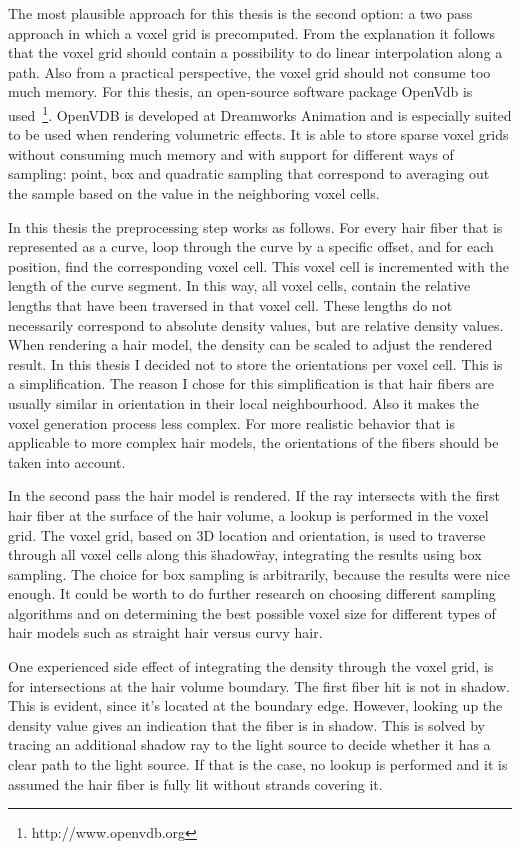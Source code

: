 \documentclass[11pt,a4paper]{report}
\begin{document}
The most plausible approach for this thesis is the second option: a two pass approach in which a voxel grid is precomputed. From the explanation it follows that the voxel grid should contain a possibility to do linear interpolation along a path. Also from a practical perspective, the voxel grid should not consume too much memory. For this thesis, an open-source software package OpenVdb is used~\footnote{http://www.openvdb.org}. OpenVDB is developed at Dreamworks Animation and is especially suited to be used when rendering volumetric effects. It is able to store sparse voxel grids without consuming much memory and with support for different ways of sampling: point, box and quadratic sampling that correspond to averaging out the sample based on the value in the neighboring voxel cells.

In this thesis the preprocessing step works as follows. For every hair fiber that is represented as a curve, loop through the curve by a specific offset, and for each position, find the corresponding voxel cell. This voxel cell is incremented with the length of the curve segment. In this way, all voxel cells, contain the relative lengths that have been traversed in that voxel cell. These lengths do not necessarily correspond to absolute density values, but are relative density values. When rendering a hair model, the density can be scaled to adjust the rendered result. In this thesis I decided not to store the orientations per voxel cell. This is a simplification. The reason I chose for this simplification is that hair fibers are usually similar in orientation in their local neighbourhood. Also it makes the voxel generation process less complex. For more realistic behavior that is applicable to more complex hair models, the orientations of the fibers should be taken into account.

In the second pass the hair model is rendered. If the ray intersects with the first hair fiber at the surface of the hair volume, a lookup is performed in the voxel grid. The voxel grid, based on 3D location and orientation, is used to traverse through all voxel cells along this \"shadow\" ray, integrating the results using box sampling. The choice for box sampling is arbitrarily, because the results were nice enough. It could be worth to do further research on choosing different sampling algorithms and on determining the best possible voxel size for different types of hair models such as straight hair versus curvy hair.

One experienced side effect of integrating the density through the voxel grid, is for intersections at the hair volume boundary. The first fiber hit is not in shadow. This is evident, since it's located at the boundary edge. However, looking up the density value gives an indication that the fiber is in shadow. This is solved by tracing an additional shadow ray to the light source to decide whether it has a clear path to the light source. If that is the case, no lookup is performed and it is assumed the hair fiber is fully lit without strands covering it.
\end{document}
